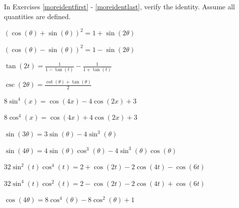 \documentclass{ximera}
\begin{document}
\begin{question}
    
In Exercises \ref{moreidentfirst} - \ref{moreidentlast}, verify the identity.  Assume all quantities are defined.

\begin{problem}\label{moreidentfirst}
$(\cos(\theta) + \sin(\theta))^2 = 1 + \sin(2\theta)$
\end{problem}

\begin{problem}
    $(\cos(\theta) - \sin(\theta))^2 = 1 - \sin(2\theta)$
\end{problem}

\begin{problem}
    $\tan(2t) = \frac{1}{1-\tan(t)} - \frac{1}{1+\tan(t)}$
\end{problem}

\begin{problem}
    $\csc(2\theta) = \frac{\cot(\theta) + \tan(\theta)}{2}$
\end{problem}

\begin{problem}
    $8 \sin^{4}(x) = \cos(4x) - 4\cos(2x)+3$
\end{problem}

\begin{problem}
    $8 \cos^{4}(x) = \cos(4x) + 4\cos(2x)+3$
\end{problem}

\begin{problem}\label{sine3theta}
    $\sin(3\theta) = 3\sin(\theta) - 4\sin^{3}(\theta)$
\end{problem}

\begin{problem}
    $\sin(4\theta) = 4\sin(\theta)\cos^{3}(\theta) - 4\sin^{3}(\theta)\cos(\theta)$
\end{problem}

\begin{problem}
    $32\sin^{2}(t) \cos^{4}(t) = 2 + \cos(2t) - 2\cos(4t) - \cos(6t)$
\end{problem}

\begin{problem}
    $32\sin^{4}(t) \cos^{2}(t) = 2 - \cos(2t) - 2\cos(4t) + \cos(6t)$
\end{problem}

\begin{problem}\label{cosine4theta} 
    $\cos(4\theta) = 8\cos^{4}(\theta) - 8\cos^{2}(\theta) + 1$
\end{problem}


\end{question}
\end{document}
